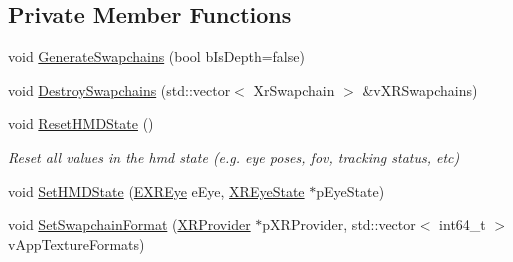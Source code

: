\subsection*{Private Member Functions}
\begin{DoxyCompactItemize}
\item 
void \mbox{\hyperlink{class_open_x_r_provider_1_1_x_r_render_manager_a20c0a78fcd0d2a2135d878202d932a06}{Generate\+Swapchains}} (bool b\+Is\+Depth=false)
\item 
void \mbox{\hyperlink{class_open_x_r_provider_1_1_x_r_render_manager_af2615e2a53735d24df7a641e550bd800}{Destroy\+Swapchains}} (std\+::vector$<$ Xr\+Swapchain $>$ \&v\+X\+R\+Swapchains)
\item 
void \mbox{\hyperlink{class_open_x_r_provider_1_1_x_r_render_manager_ab3dbed1a6e82b338e948def236adbf7b}{Reset\+H\+M\+D\+State}} ()
\begin{DoxyCompactList}\small\item\em Reset all values in the hmd state (e.\+g. eye poses, fov, tracking status, etc) \end{DoxyCompactList}\item 
void \mbox{\hyperlink{class_open_x_r_provider_1_1_x_r_render_manager_ab9e9d2271f8c7e2740dad5e99c92343c}{Set\+H\+M\+D\+State}} (\mbox{\hyperlink{namespace_open_x_r_provider_a8aa379869e30772896e6c468eb54f155}{E\+X\+R\+Eye}} e\+Eye, \mbox{\hyperlink{struct_open_x_r_provider_1_1_x_r_eye_state}{X\+R\+Eye\+State}} $\ast$p\+Eye\+State)
\item 
void \mbox{\hyperlink{class_open_x_r_provider_1_1_x_r_render_manager_a02385e908d4a85e783c20283239f9542}{Set\+Swapchain\+Format}} (\mbox{\hyperlink{class_open_x_r_provider_1_1_x_r_provider}{X\+R\+Provider}} $\ast$p\+X\+R\+Provider, std\+::vector$<$ int64\+\_\+t $>$ v\+App\+Texture\+Formats)
\end{DoxyCompactItemize}
